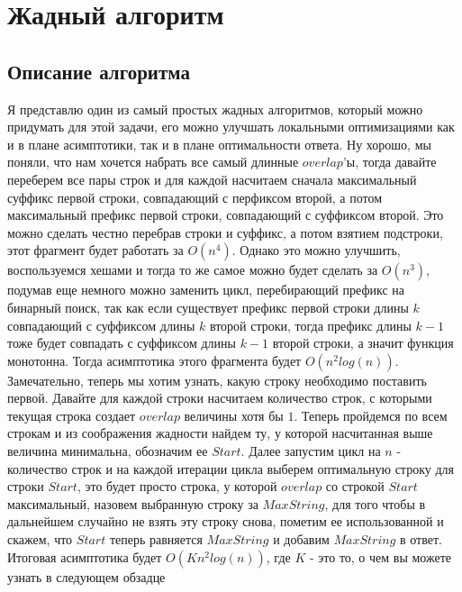 \documentclass{article}
\begin{document}
\newpage
\section{Жадный алгоритм}
\subsection{Описание алгоритма}
\newline
Я представлю один из самый простых жадных алгоритмов, который можно придумать для этой задачи, его можно улучшать локальными оптимизациями как и в плане асимптотики, так и в плане оптимальности ответа.\newline
Ну хорошо, мы поняли, что нам хочется набрать все самый длинные $overlap$'ы, тогда давайте переберем все пары строк и для каждой насчитаем сначала максимальный суффикс первой строки, совпадающий с перфиксом второй, а потом максимальный префикс первой строки, совпадающий с суффиксом второй. Это можно сделать честно перебрав строки и суффикс, а потом взятием подстроки, этот фрагмент будет работать за $O(n^4)$. Однако это можно улучшить, воспользуемся хешами и тогда то же самое можно будет сделать за $O(n^3)$, подумав еще немного можно заменить цикл, перебирающий префикс на бинарный поиск, так как если существует префикс первой строки длины $k$ совпадающий с суффиксом длины $k$ второй строки, тогда префикс длины $k-1$ тоже будет совпадать с суффиксом длины $k-1$ второй строки, а значит функция монотонна. Тогда асимптотика этого фрагмента будет $O(n^2log(n))$.\newline
Замечательно, теперь мы хотим узнать, какую строку необходимо поставить первой. Давайте для каждой строки насчитаем количество строк, с которыми текущая строка создает $overlap$ величины хотя бы $1$. Теперь пройдемся по всем строкам и из соображения жадности найдем ту, у которой насчитанная выше величина минимальна, обозначим ее $Start$. Далее запустим цикл на $n$ - количество строк и на каждой итерации цикла выберем оптимальную строку для строки $Start$, это будет просто строка, у которой $overlap$ со строкой $Start$ максимальный, назовем выбранную строку за $MaxString$, для того чтобы в дальнейшем случайно не взять эту строку снова, пометим ее
использованной и скажем, что $Start$ теперь равняется $MaxString$ и добавим $MaxString$ в ответ.\newline
Итоговая асимптотика будет $O(Kn^2log(n))$, где $K$ - это то, о чем вы можете узнать в следующем обзадце
\end{document}
